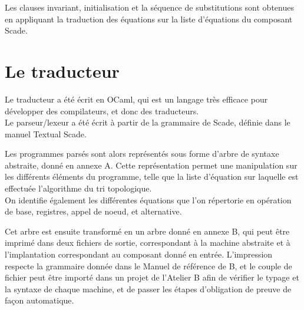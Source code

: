Les clauses invariant, initialisation et la séquence de substitutions
sont obtenues en appliquant la traduction des équations
sur la liste d'équations du composant Scade.

\section{Le traducteur}

Le traducteur a été écrit en OCaml, qui est un langage très efficace
pour développer des compilateurs, et donc des traducteurs.\\
Le parseur/lexeur a été écrit à partir de la grammaire de Scade,
définie dans le manuel Textual Scade.

Les programmes parsés sont alors représentés sous forme d'arbre de
syntaxe abstraite, donné en annexe A. Cette représentation permet une
manipulation sur les différents éléments du programme, telle que la
liste d'équation sur laquelle est effectuée l'algorithme du tri
topologique. \\
On identifie également les différentes équations que l'on
répertorie en opération de base, registres, appel de noeud, et
alternative.

Cet arbre est ensuite transformé en un arbre donné en annexe B,
qui peut être imprimé dans deux fichiers de sortie, correspondant à
la machine abstraite et à l'implantation correspondant au composant
donné en entrée. L'impression respecte la grammaire donnée dans le
Manuel de référence de B, et le couple de fichier peut être importé
dans un projet de l'Atelier B afin de vérifier le typage et la syntaxe
de chaque machine, et de passer les étapes d'obligation de preuve de
façon automatique.
